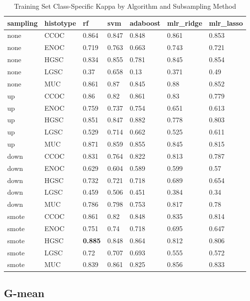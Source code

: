 \documentclass[
]{report}
\begin{document}
\begin{table}

\caption{\label{tab:train-kappa-class-table}Training Set Class-Specific Kappa by Algorithm and Subsampling Method}
\centering
\begin{tabular}[t]{l|l|l|l|l|l|l}
\hline
sampling & histotype & rf & svm & adaboost & mlr\_ridge & mlr\_lasso\\
\hline
none & CCOC & 0.864 & 0.847 & 0.848 & 0.861 & 0.853\\
\hline
none & ENOC & 0.719 & 0.763 & 0.663 & 0.743 & 0.721\\
\hline
none & HGSC & 0.834 & 0.855 & 0.781 & 0.845 & 0.854\\
\hline
none & LGSC & 0.37 & 0.658 & 0.13 & 0.371 & 0.49\\
\hline
none & MUC & 0.861 & 0.87 & 0.845 & 0.88 & 0.852\\
\hline
up & CCOC & 0.86 & 0.82 & 0.861 & 0.83 & 0.779\\
\hline
up & ENOC & 0.759 & 0.737 & 0.754 & 0.651 & 0.613\\
\hline
up & HGSC & 0.851 & 0.847 & 0.882 & 0.778 & 0.803\\
\hline
up & LGSC & 0.529 & 0.714 & 0.662 & 0.525 & 0.611\\
\hline
up & MUC & 0.871 & 0.859 & 0.855 & 0.845 & 0.815\\
\hline
down & CCOC & 0.831 & 0.764 & 0.822 & 0.813 & 0.787\\
\hline
down & ENOC & 0.629 & 0.604 & 0.589 & 0.599 & 0.57\\
\hline
down & HGSC & 0.732 & 0.721 & 0.718 & 0.689 & 0.654\\
\hline
down & LGSC & 0.459 & 0.506 & 0.451 & 0.384 & 0.34\\
\hline
down & MUC & 0.786 & 0.798 & 0.753 & 0.817 & 0.78\\
\hline
smote & CCOC & 0.861 & 0.82 & 0.848 & 0.835 & 0.814\\
\hline
smote & ENOC & 0.751 & 0.74 & 0.718 & 0.695 & 0.647\\
\hline
smote & HGSC & \textbf{0.885} & 0.848 & 0.864 & 0.812 & 0.806\\
\hline
smote & LGSC & 0.72 & 0.707 & 0.693 & 0.555 & 0.572\\
\hline
smote & MUC & 0.839 & 0.861 & 0.825 & 0.856 & 0.833\\
\hline
\end{tabular}
\end{table}

\hypertarget{g-mean}{%
\subsection{G-mean}\label{g-mean}}
\end{document}
